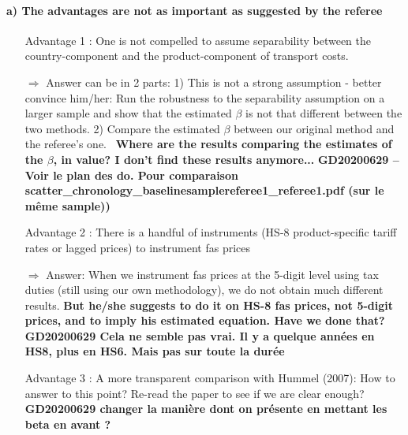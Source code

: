\documentclass[a4paper,12pt]{article}
\begin{document}
\paragraph{a) The advantages are not as important as suggested by the referee}
\begin{itemize}
\item[Advantage 1]: One is not compelled to assume separability between the country-component and the product-component of transport costs.
\item[$\Rightarrow$] Answer can be in 2 parts: 1) This is not a strong assumption - better convince him/her: Run the robustness to the separability assumption on a larger sample and show that the estimated $\beta$ is not that different between the two methods. 2) Compare the estimated $\beta$ between our original method and the referee's one. \
\textbf{Where are the results comparing the estimates of the $\beta$, in value? I don't find these results anymore...}
\textbf{GD20200629 -- Voir le plan des do. Pour comparaison scatter_chronology_baselinesamplereferee1_referee1.pdf (sur le même sample))}




\item[Advantage 2]: There is a handful of instruments (HS-8 product-specific tariff rates or lagged prices) to instrument fas prices
\item[$\Rightarrow$] Answer: When we instrument fas prices at the 5-digit level using tax duties (still using our own methodology), we do not obtain much different results. \textbf{But he/she suggests to do it on HS-8 fas prices, not 5-digit prices, and to imply his estimated equation. Have we done that?}
\textbf{GD20200629 Cela ne semble pas vrai. Il y a quelque années en HS8, plus en HS6. Mais pas sur toute la durée}
\item[Advantage 3]: A more transparent comparison with Hummel (2007): How to answer to this point? Re-read the paper to see if we are clear enough?
\textbf{GD20200629 changer la manière dont on présente en mettant les beta en avant ?}
\end{itemize}
\end{document}
